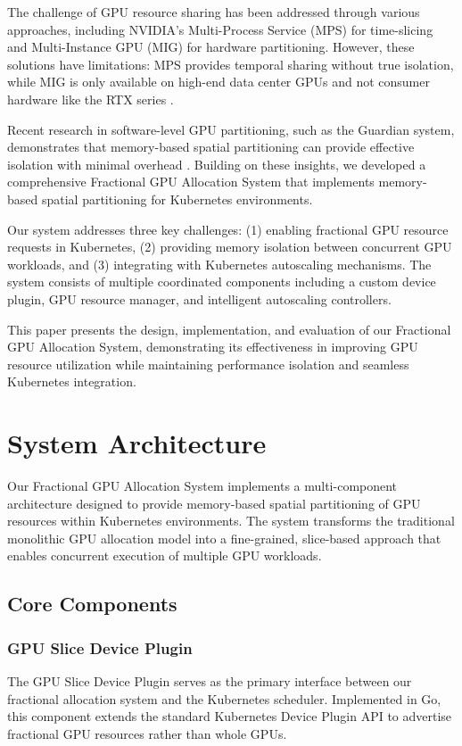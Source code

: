 \documentclass[10pt,twocolumn,letterpaper]{article}
\begin{document}
The challenge of GPU resource sharing has been addressed through various approaches, including NVIDIA's Multi-Process Service (MPS) for time-slicing and Multi-Instance GPU (MIG) for hardware partitioning. However, these solutions have limitations: MPS provides temporal sharing without true isolation, while MIG is only available on high-end data center GPUs and not consumer hardware like the RTX series \cite{nvidia_mps}.

Recent research in software-level GPU partitioning, such as the Guardian system, demonstrates that memory-based spatial partitioning can provide effective isolation with minimal overhead \cite{guardian_system}. Building on these insights, we developed a comprehensive Fractional GPU Allocation System that implements memory-based spatial partitioning for Kubernetes environments.

Our system addresses three key challenges: (1) enabling fractional GPU resource requests in Kubernetes, (2) providing memory isolation between concurrent GPU workloads, and (3) integrating with Kubernetes autoscaling mechanisms. The system consists of multiple coordinated components including a custom device plugin, GPU resource manager, and intelligent autoscaling controllers.

This paper presents the design, implementation, and evaluation of our Fractional GPU Allocation System, demonstrating its effectiveness in improving GPU resource utilization while maintaining performance isolation and seamless Kubernetes integration.

\section{System Architecture}

Our Fractional GPU Allocation System implements a multi-component architecture designed to provide memory-based spatial partitioning of GPU resources within Kubernetes environments. The system transforms the traditional monolithic GPU allocation model into a fine-grained, slice-based approach that enables concurrent execution of multiple GPU workloads.

\subsection{Core Components}

\subsubsection{GPU Slice Device Plugin}
The GPU Slice Device Plugin serves as the primary interface between our fractional allocation system and the Kubernetes scheduler. Implemented in Go, this component extends the standard Kubernetes Device Plugin API to advertise fractional GPU resources rather than whole GPUs.
\end{document}
